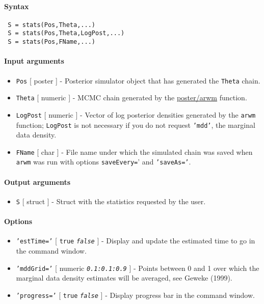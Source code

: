 


	\paragraph{Syntax}
 
 \begin{verbatim}
 S = stats(Pos,Theta,...)
 S = stats(Pos,Theta,LogPost,...)
 S = stats(Pos,FName,...)
 \end{verbatim}
 
 \paragraph{Input arguments}
 
 \begin{itemize}
 \item
   \texttt{Pos} {[} poster {]} - Posterior simulator object that has
   generated the \texttt{Theta} chain.
 \item
   \texttt{Theta} {[} numeric {]} - MCMC chain generated by the
   \url{poster/arwm} function.
 \item
   \texttt{LogPost} {[} numeric {]} - Vector of log posterior densities
   generated by the \texttt{arwm} function; \texttt{LogPost} is not
   necessary if you do not request \texttt{'mdd'}, the marginal data
   density.
 \item
   \texttt{FName} {[} char {]} - File name under which the simulated
   chain was saved when \texttt{arwm} was run with options
   \texttt{saveEvery=}' and \texttt{'saveAs='}.
 \end{itemize}
 
 \paragraph{Output arguments}
 
 \begin{itemize}
 \item
   \texttt{S} {[} struct {]} - Struct with the statistics requested by
   the user.
 \end{itemize}
 
 \paragraph{Options}
 
 \begin{itemize}
 \item
   \texttt{'estTime='} {[} \texttt{true} \textbar{} \emph{\texttt{false}}
   {]} - Display and update the estimated time to go in the command
   window.
 \item
   \texttt{'mddGrid='} {[} numeric \textbar{} \emph{\texttt{0.1:0.1:0.9}}
   {]} - Points between 0 and 1 over which the marginal data density
   estimates will be averaged, see Geweke (1999).
 \item
   \texttt{'progress='} {[} \texttt{true} \textbar{}
   \emph{\texttt{false}} {]} - Display progress bar in the command
   window.
 \end{itemize}
 
